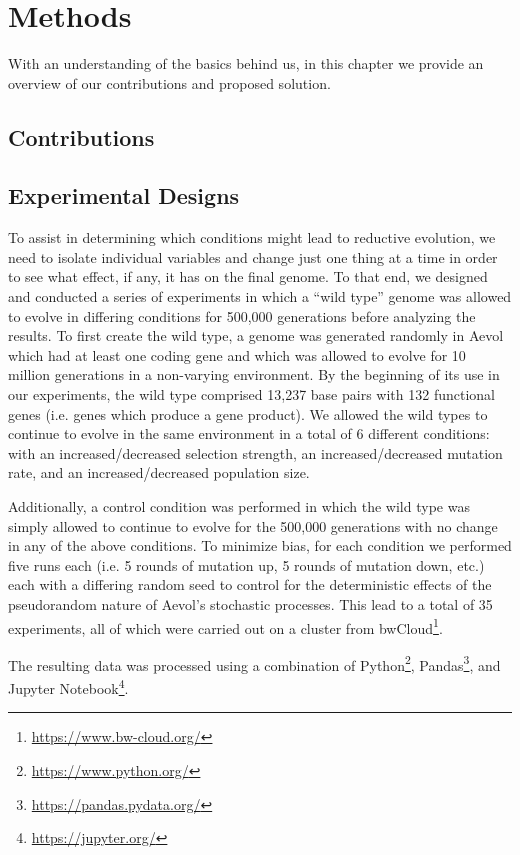 \chapter{Methods}\label{ch:methods}
With an understanding of the basics behind us, in this chapter we provide an overview of our contributions and proposed solution.

\section{Contributions}

\section{Experimental Designs} \label{experimental_design}
To assist in determining which conditions might lead to reductive evolution, we need to isolate individual variables and change just one thing at a time in order to see what effect, if any, it has on the final genome. To that end, we designed and conducted a series of experiments in which a ``wild type'' genome was allowed to evolve in differing conditions for 500,000 generations before analyzing the results. To first create the wild type, a genome was generated randomly in Aevol which had at least one coding gene and which was allowed to evolve for 10 million generations in a non-varying environment. By the beginning of its use in our experiments, the wild type comprised 13,237 base pairs with 132 functional genes (i.e. genes which produce a gene product). We allowed the wild types to continue to evolve in the same environment in a total of 6 different conditions: with an increased/decreased selection strength, an increased/decreased mutation rate, and an increased/decreased population size. 

Additionally, a control condition was performed in which the wild type was simply allowed to continue to evolve for the 500,000 generations with no change in any of the above conditions. To minimize bias, for each condition we performed five runs each (i.e. 5 rounds of mutation up, 5 rounds of mutation down, etc.) each with a differing random seed to control for the deterministic effects of the pseudorandom nature of Aevol's stochastic processes. This lead to a total of 35 experiments, all of which were carried out on a cluster from bwCloud\footnote{\url{https://www.bw-cloud.org/}}. 

The resulting data was processed using a combination of Python\footnote{\url{https://www.python.org/}}, Pandas\footnote{\url{https://pandas.pydata.org/}}, and Jupyter Notebook\footnote{\url{https://jupyter.org/}}.  

